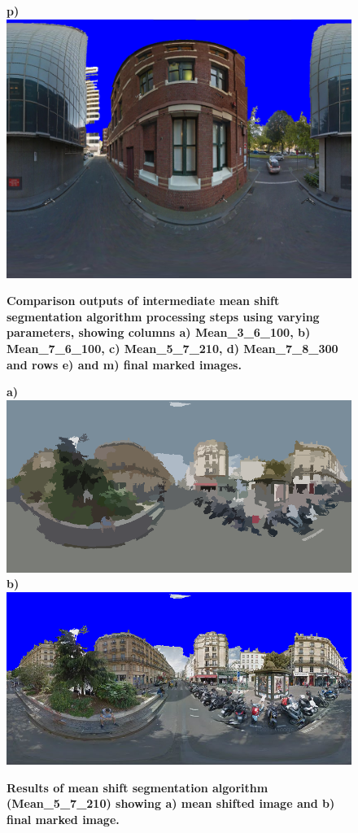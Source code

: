 \documentclass[final,3p,times,authoryear]{elsarticle}
\begin{document}
\begin{figure}
\textbf{p)}\includegraphics[scale=0.08]{Images/mean/0070_7_8_300_ms_sky_mark.png} 

\caption{\bf Comparison outputs of intermediate mean shift segmentation algorithm processing steps using varying parameters, showing columns a) Mean\_3\_6\_100, b) Mean\_7\_6\_100, c) Mean\_5\_7\_210, d) Mean\_7\_8\_300 and rows e) and m) final marked images. }
 \label{fig:meantypes}  
\end{figure} 




\begin{figure}
\centering    
\textbf{a)}\includegraphics[scale=0.26]{Images/2/panorama-JtVHmEl7WCiz1xJ0bcJpBg-1_seg.png} 
\textbf{b)}\includegraphics[scale=0.26]{Images/2/panorama-JtVHmEl7WCiz1xJ0bcJpBg-1_ms_sky_mark.png} 
\caption{\bf Results of mean shift segmentation algorithm (Mean\_5\_7\_210) showing a) mean shifted image and b) final marked image.}    
 \label{fig:meanresults}  
\end{figure} 
\end{document}
